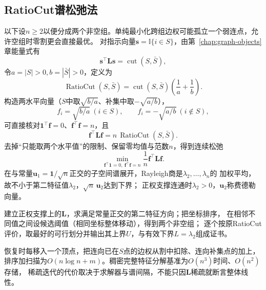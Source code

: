 \subsection{RatioCut谱松弛法}
\label{sec:graph-theory-ratio-cut}
以下设$n\geq2$以便分成两个非空组。单纯最小化跨组边权可能孤立一个弱连点，允许空组时零割更会直接最优。
对指示向量$\bm s=\mathbb I\{i\in S\}$，由第~\ref{chap:graph-objects}章能量式有
\begin{equation}
  \bm s^\top\bm L\bm s=\operatorname{cut}(S,\bar S),
  \label{eq:graph-theory-indicator-cut-energy}
\end{equation}
令$a=|S|>0,b=|\bar S|>0$，定义为
\begin{equation}
  \operatorname{RatioCut}(S,\bar S)=\operatorname{cut}(S,\bar S)\left(\frac1a+\frac1b\right).
  \label{eq:graph-theory-ratio-cut}
\end{equation}
构造两水平向量（$S$中取$\sqrt{b/a}$、补集中取$-\sqrt{a/b}$），
\begin{equation}
  f_i=\sqrt{b/a}\ (i\in S),\qquad f_i=-\sqrt{a/b}\ (i\notin S),
  \label{eq:graph-theory-ratio-cut-balanced-vector}
\end{equation}
可直接核对$\bm1^\top\bm f=0$、$\bm f^\top\bm f=n$，且
\begin{equation}
  \bm f^\top\bm L\bm f=n\,\operatorname{RatioCut}(S,\bar S).
  \label{eq:graph-theory-ratio-cut-energy}
\end{equation}
去掉“只能取两个水平值”的限制、保留零均值与范数$n$，得到连续松弛
\begin{equation}
  \min_{\bm f^\top\bm1=0,\ \bm f^\top\bm f=n}\frac1n\bm f^\top\bm L\bm f.
  \label{eq:graph-theory-ratio-cut-relaxation}
\end{equation}
在与常量$\bm u_1=\bm1/\sqrt n$正交的子空间谱展开，Rayleigh商是$\lambda_2,\ldots,\lambda_n$的
加权平均，故不小于第二特征值$\lambda_2$，$\sqrt n\,\bm u_2$达到下界；
正权支撑连通时$\lambda_2>0$，$\bm u_2$称费德勒向量。
\begin{algorithm}[谱划分与恢复]
  建立正权支撑上的$\bm L$，求满足常量正交的第二特征方向；把坐标排序，
  在相邻不同值之间设候选阈值（相同坐标整体移动），得到两个非空组；
  逐个按原RatioCut评价，取最好的可行划分并输出其上界$U$，与有效下界$L=\lambda_2$组成证书。
\end{algorithm}
恢复时每移入一个顶点，把连向已在$S$点的边权从割中扣除、连向补集点的加上，
排序加扫描为$O(n\log n+m)$。稠密完整特征分解基准为$O(n^3)$时间、$O(n^2)$存储，
稀疏迭代的代价取决于求解器与谱间隔，不能只因$\bm L$稀疏就断言整体线性。

